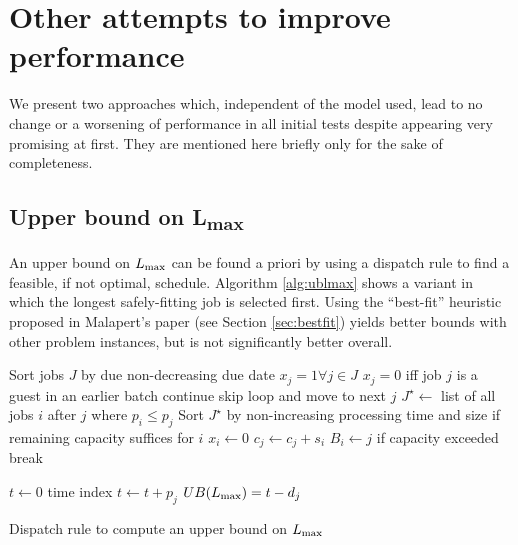 \documentclass[13pt, letterpaper, oneside]{book}
\begin{document}
\section{Other attempts to improve performance}
We present two approaches which, independent of the model used, lead to no change
or a worsening of performance in all initial tests despite appearing very
promising at first. They are mentioned here briefly only for the sake of
completeness.

\subsection[Upper bound on $\Lmax$]{Upper bound on {\sansitalicfont L}\textsubscript{max}}
\label{sec:ublmax}
An upper bound on $\Lmax$ can be found a priori by using a dispatch rule to find a
feasible, if not optimal, schedule. Algorithm \ref{alg:ublmax} shows a variant
in which the longest safely-fitting job is selected first. Using the ``best-fit''
heuristic proposed in Malapert's paper (see Section \ref{sec:bestfit}) yields
better bounds with other problem instances, but is not significantly better
overall. 

\begin{algorithm}[h]
\fontsize{9pt}{11.5pt}\selectfont
\begin{algorithmic}
\State Sort jobs $J$ by due non-decreasing due date
\State $x_j = 1 \forall j \in J$  \Comment $x_j = 0$ iff job $j$ is a guest in an earlier batch
      \State continue \Comment skip loop and move to next $j$
  \EndIf
  \State $J^\star \gets$ list of all jobs $i$ after $j$ where $p_i \leq p_j$
  \State Sort $J^\star$ by non-increasing processing time and size
     \Comment if remaining capacity suffices for $i$
      \State $x_i \gets 0$
      \State $c_j \gets c_j + s_i$
      \State $B_i \gets j$
    \EndIf
     \Comment if capacity exceeded
      \State break
    \EndIf

\State $t \gets 0$ \Comment time index
    \State $t \gets t + p_j$
      \State $UB(L_{\text{max}}) = t - d_j$
    \EndIf
  \EndIf
{}
\end{algorithmic}
\caption{Dispatch rule to compute an upper bound on $\Lmax$}
\label{alg:ublmax}
\end{algorithm}
\end{document}
